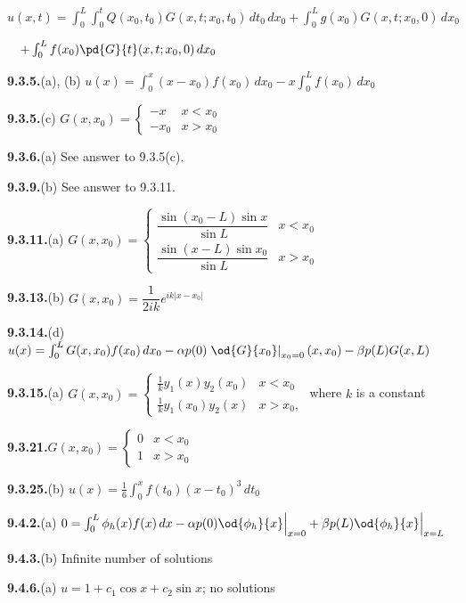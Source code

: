 $u(x,t) = \int_0^L\int_0^t Q(x_0,t_0)G(x,t;x_0,t_0)\,dt_0\,dx_0 + \int_0^L g(x_0)G(x,t;x_0,0)\,dx_0$

$\quad + \int_0^L f(x_0)\pd{G}{t}(x,t;x_0,0)\,dx_0$%

\medskip
\textbf{9.3.5.}\quad (a), (b) $u(x) = \int_0^x (x-x_0)f(x_0)\,dx_0 - x\int_0^L f(x_0)\,dx_0$

\medskip
\textbf{9.3.5.}\quad (c) $G(x,x_0) = \begin{cases} -x & x < x_0 \\ -x_0 & x > x_0 \end{cases}$

\medskip
\textbf{9.3.6.}\quad (a) See answer to 9.3.5(c).

\medskip
\textbf{9.3.9.}\quad (b) See answer to 9.3.11.

\medskip
\textbf{9.3.11.}\quad (a) $G(x,x_0) = \begin{cases} \dfrac{\sin(x_0-L)\sin x}{\sin L} & x < x_0 \\[6pt] \dfrac{\sin(x-L)\sin x_0}{\sin L} & x > x_0 \end{cases}$

\medskip
\textbf{9.3.13.}\quad (b) $G(x,x_0) = \dfrac{1}{2ik}e^{ik|x-x_0|}$

\medskip
\textbf{9.3.14.}\quad (d) $u(x) = \int_0^L G(x,x_0)f(x_0)\,dx_0 - \alpha p(0)\left.\od{G}{x_0}\right|_{x_0=0}(x,x_0) - \beta p(L)G(x,L)$%

\medskip
\textbf{9.3.15.}\quad (a) $G(x,x_0) = \begin{cases} \frac{1}{k}y_1(x)y_2(x_0) & x < x_0 \\ \frac{1}{k}y_1(x_0)y_2(x) & x > x_0, \end{cases}$ where $k$ is a constant

\medskip
\textbf{9.3.21.}\quad $G(x,x_0) = \begin{cases} 0 & x < x_0 \\ 1 & x > x_0 \end{cases}$

\medskip
\textbf{9.3.25.}\quad (b) $u(x) = \frac{1}{6}\int_0^x f(t_0)(x-t_0)^3\,dt_0$

\medskip
\textbf{9.4.2.}\quad (a) $0 = \int_0^L \phi_h(x)f(x)\,dx - \alpha p(0)\od{\phi_h}{x}\Big|_{x=0} + \beta p(L)\od{\phi_h}{x}\Big|_{x=L}$

\medskip
\textbf{9.4.3.}\quad (b) Infinite number of solutions

\medskip
\textbf{9.4.6.}\quad (a) $u = 1 + c_1\cos x + c_2\sin x$; no solutions

